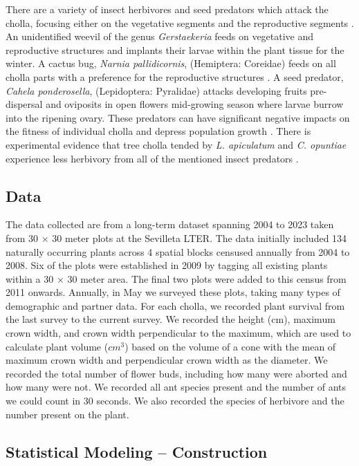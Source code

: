 \documentclass[11pt]{article}
\begin{document}
There are a variety of insect herbivores and seed predators which attack the cholla, focusing either on the vegetative segments and the reproductive segments \citep{Mann1969}. 
An unidentified weevil of the genus \textit{Gerstaekeria} feeds on vegetative and reproductive structures and implants their larvae within the plant tissue for the winter. 
A cactus bug, \textit{Narnia pallidicornis}, (Hemiptera: Coreidae) feeds on all cholla parts with a preference for the reproductive structures \citep{Miller2006}.
A seed predator, \textit{Cahela ponderosella}, (Lepidoptera: Pyralidae) attacks developing fruits pre-dispersal and oviposits in open flowers mid-growing season where larvae burrow into the ripening ovary. 
These predators can have significant negative impacts on the fitness of individual cholla and depress population growth \citep{Miller2009}.
There is experimental evidence that tree cholla tended by \textit{L. apiculatum} and \textit{C. opuntiae} experience less herbivory from all of the mentioned insect predators \citep{Miller2007}. 

\subsection*{Data}
	
The data collected are from a long-term dataset spanning 2004 to 2023 taken from 30 $\times$ 30 meter plots at the Sevilleta LTER. 
The data initially included 134 naturally occurring plants across 4 spatial blocks censused annually from 2004 to 2008.
Six of the plots were established in 2009 by tagging all existing plants within a 30 $\times$ 30 meter area. 
The final two plots were added to this census from 2011 onwards. 
Annually, in May we surveyed these plots, taking many types of demographic and partner data. 
For each cholla, we recorded plant survival from the last survey to the current survey. 
We recorded the height (cm), maximum crown width, and crown width perpendicular to the maximum, which are used to calculate plant volume ($cm^3$) based on the volume of a cone with the mean of maximum crown width and perpendicular crown width as the diameter. 
We recorded the total number of flower buds, including how many were aborted and how many were not. We recorded all ant species present and the number of ants we could count in 30 seconds. 
We also recorded the species of herbivore and the number present on the plant.
		
\subsection*{Statistical Modeling -- Construction}
	
\end{document}
